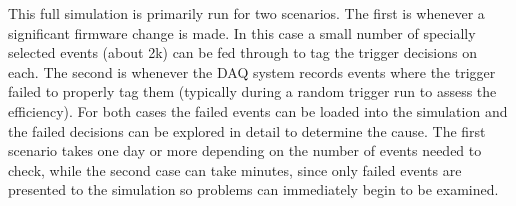 This full simulation is primarily run for two scenarios. The first is whenever a significant firmware change is made. In this case a small number of specially selected events (about 2k) can be fed through to tag the trigger decisions on each. The second is whenever the DAQ system records events where the trigger failed to properly tag them (typically during a random trigger run to assess the efficiency). For both cases the failed events can be loaded into the simulation and the failed decisions can be explored in detail to determine the cause. The first scenario takes one day or more depending on the number of events needed to check, while the second case can take minutes, since only failed events are presented to the simulation so problems can immediately begin to be examined.